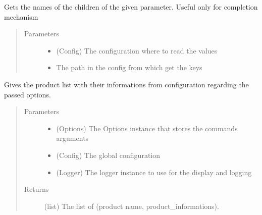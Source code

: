 \documentclass[a4paper,10pt,english]{sphinxmanual}
\begin{document}
\begin{fulllineitems}
\label{\detokenize{apidoc_src/src:src.configManager.get_config_children}}
Gets the names of the children of the given parameter.
Useful only for completion mechanism
\begin{quote}\begin{description}
\item[{Parameters}] \leavevmode\begin{itemize}
\item {} 
 \textendash{} (Config) The configuration where to read the values

\item {} 
 \textendash{} The path in the config from which get the keys

\end{itemize}

\end{description}\end{quote}

\end{fulllineitems}


\begin{fulllineitems}
\label{\detokenize{apidoc_src/src:src.configManager.get_products_list}}
Gives the product list with their informations from 
configuration regarding the passed options.
\begin{quote}\begin{description}
\item[{Parameters}] \leavevmode\begin{itemize}
\item {} 
 \textendash{} (Options) 
The Options instance that stores the commands arguments

\item {} 
 \textendash{} (Config) The global configuration

\item {} 
 \textendash{} (Logger) 
The logger instance to use for the display and logging

\end{itemize}

\item[{Returns}] \leavevmode
(list) The list of (product name, product\_informations).

\end{description}\end{quote}

\end{fulllineitems}
\end{document}
